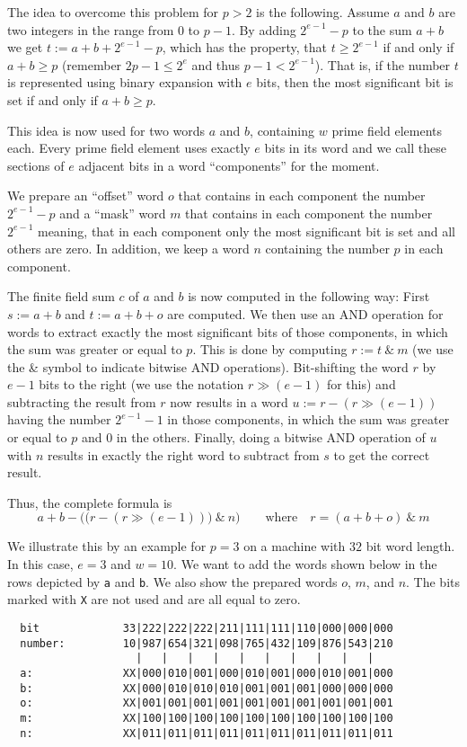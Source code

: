 The idea to overcome this problem for $p > 2$ is the following. 
Assume $a$ and $b$
are two integers in the range from $0$ to $p-1$. By adding
$2^{e-1}-p$ to the sum $a+b$ we get $t := a+b+2^{e-1}-p$, which
has the property, that $t \ge 2^{e-1}$ if and only if $a+b \ge p$
(remember $2p-1 \le 2^e$ and thus $p-1 < 2^{e-1}$). That is, if
the number $t$ is represented using binary expansion with $e$ bits,
then the most significant bit is set if and only if $a+b \ge p$.

This idea is now used for two words $a$ and $b$, containing $w$
prime field elements each. Every prime field element uses exactly $e$ bits
in its word and we call these sections of $e$ adjacent bits in a word 
``components'' for the moment. 

We prepare an ``offset'' word $o$ that contains in each component the
number $2^{e-1}-p$ and a ``mask'' word $m$ that contains in each component
the number $2^{e-1}$ meaning, that in each component only the most significant
bit is set and all others are zero. In addition, we keep a word $n$
containing the number $p$ in each component.

The finite field sum $c$ of $a$ and $b$ is now computed in the following way:
First $s := a+b$ and $t := a+b+o$ are computed. We then use an AND 
operation for words to extract exactly the most significant bits of
those components, in which the sum was greater or equal to $p$.
This is done by computing $r := t \ \&\  m$ (we use the \& symbol to
indicate bitwise AND operations). Bit-shifting
the word $r$ by $e-1$ bits to the right (we use the notation
$r \gg (e-1)$ for this) and subtracting the
result from $r$ now results in a word $u := r - (r \gg (e-1))$
having the number $2^{e-1}-1$
in those components, in which the sum was greater or equal to $p$ and
$0$ in the others. Finally, doing a bitwise AND operation of $u$ with
$n$ results in exactly the right word to subtract from $s$ to get
the correct result.

Thus, the complete formula is
\[ a+b - \Big(\big(r - (r \gg (e-1))\big) \ \&\ n \Big)
   \qquad \mbox{where}\quad r = (a+b+o) \ \&\  m \]

We illustrate this by an example for $p=3$ on a machine with
$32$ bit word length. In this case, $e = 3$ and $w = 10$. We want to
add the words shown below in the rows depicted by \texttt{a} and \texttt{b}.
We also show the prepared words $o$, $m$, and $n$. The bits marked
with \texttt{X} are not used and are all equal to zero.

\begin{verbatim}
  bit             33|222|222|222|211|111|111|110|000|000|000
  number:         10|987|654|321|098|765|432|109|876|543|210
                    |   |   |   |   |   |   |   |   |   |
  a:              XX|000|010|001|000|010|001|000|010|001|000
  b:              XX|000|010|010|010|001|001|001|000|000|000
  o:              XX|001|001|001|001|001|001|001|001|001|001
  m:              XX|100|100|100|100|100|100|100|100|100|100
  n:              XX|011|011|011|011|011|011|011|011|011|011
\end{verbatim}

